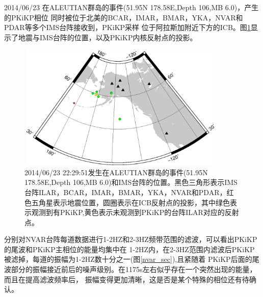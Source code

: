 2014/06/23 在ALEUTIAN群岛的事件(51.95N 178.58E,Depth 106,MB 6.0)，产生的PKiKP相位
同时被位于北美的BCAR，IMAR，BMAR，YKA，NVAR和PDAR等多个IMS台阵接收到，PKiKP采样
位于阿拉斯加附近下方的ICB。图\ref{alas}显示了地震与IMS台阵的位置，以及PKiKP内核反射点的投影。

\begin{figure}[!ht]
	\centering
	\includegraphics[height=6cm,width=10cm]{fig/chap3/ALAS.eps}
	\caption{2014/06/23 22:29:51发生在ALEUTIAN群岛的事件(51.95N 178.58E,Depth 106,MB%
6.0)和IMS台阵的位置。黑色三角形表示IMS台阵ILAR，BCAR，IMAR，BMAR，YKA，NVAR和PDAR，红色五角星表示地震位置，圆圈表示在ICB反射点的投影，其中绿色表示观测到有PKiKP,黄色表示未观测到PKiKP的台阵ILAR对应的反射点。}
	\label{alas}
\end{figure}

分别对NVAR台阵每道数据进行1-2HZ和2-3HZ频带范围的滤波，可以看出PKiKP的尾波和PKiKP主相位的能量均集中在
1-2HZ内，在2-3HZ范围内滤波后PKiKP被滤掉，每道的振幅为1-2HZ数十分之一(图\ref{nvar_sec}),且紧随着
PKiKP后面的尾波部分的振幅接近前后的噪声级别。在1175s左右似乎存在一个突然出现的能量，而且在提高滤波频率后，
振幅变得更加清晰，这是否是某个特殊的相位还有待确认。


